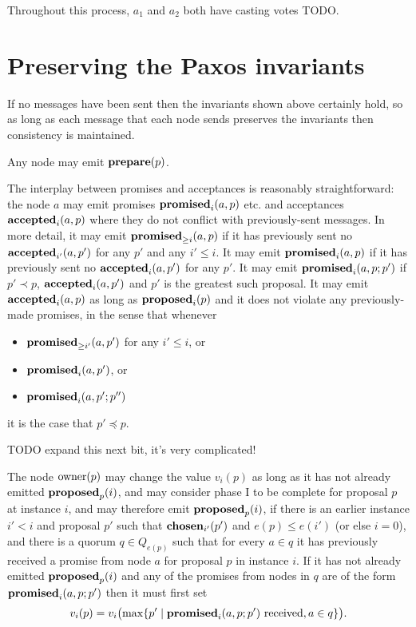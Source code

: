 \documentclass[journal]{IEEEtran}
\begin{document}
Throughout this process, $a_1$ and $a_2$ both have casting votes TODO.

\section{Preserving the Paxos invariants}

If no messages have been sent then the invariants shown above certainly hold,
so as long as each message that each node sends preserves the invariants then
consistency is maintained.

Any node may emit $\mathbf{prepare}(p)$.

The interplay between promises and acceptances is reasonably straightforward:
the node $a$ may emit promises $\mathbf{promised}_{i}(a,p)$ etc. and acceptances
$\mathbf{accepted}_{i}(a,p)$ where they do not conflict with previously-sent messages. In
more detail, it may emit $\mathbf{promised}_{\ge i}(a,p)$ if it has previously sent no
$\mathbf{accepted}_{i'}(a,p')$ for any $p'$ and any $i' \le i$.  It may emit
$\mathbf{promised}_{i}(a,p)$ if it has previously sent no $\mathbf{accepted}_{i}(a,p')$ for any $p'$.
It may emit $\mathbf{promised}_{i}(a,p;p')$ if $p' \prec p$, $\mathbf{accepted}_{i}(a,p')$ and $p'$ is
the greatest such proposal. It may emit $\mathbf{accepted}_{i}(a,p)$ as long as
$\mathbf{proposed}_{i}(p)$ and it does not violate any previously-made promises, in the
sense that whenever \begin{itemize} \item $\mathbf{promised}_{\ge i'}(a,p')$ for any $i' \le
i$, or \item $\mathbf{promised}_{i}(a,p')$, or \item $\mathbf{promised}_{i}(a,p';p'')$\end{itemize}
it is the case that $p' \preceq p$.

TODO expand this next bit, it's very complicated!

The node $\mathrm{owner}(p)$ may change the value $v_i(p)$ as long as it has not
already emitted $\mathbf{proposed}_{p}(i)$, and may consider phase I to be complete for
proposal $p$ at instance $i$, and may therefore emit $\mathbf{proposed}_{p}(i)$, if there is an
earlier instance ${i' < i}$ and proposal $p'$ such that $\mathbf{chosen}_{i'}(p')$ and
$e(p) \le e(i')$ (or else $i = 0$), and there is a quorum $q \in Q_{e(p)}$ such
that for every $a \in q$ it has previously received a promise from node $a$ for
proposal $p$ in instance $i$. If it has not already emitted $\mathbf{proposed}_{p}(i)$ and
any of the promises from nodes in $q$ are of the form $\mathbf{promised}_{i}(a,p;p')$
then it must first set \[v_i(p) = v_i\bigl(\mathrm{max} \{p' \mid
\mathbf{promised}_{i}(a,p;p') \textrm{ received}, a \in q \}\bigr).\]
\end{document}
